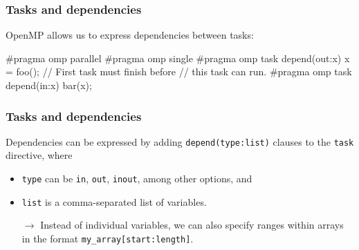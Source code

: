 \documentclass[12pt,t]{beamer}
\newcommand{\conclude}[1]{%
  \begin{itemize}
    \item[$\rightarrow$]#1
  \end{itemize}
}
\begin{document}
  \begin{frame}[fragile]
    \frametitle{Tasks and dependencies}

    OpenMP allows us to express dependencies between tasks:
    \begin{code}
#pragma omp parallel
{
  #pragma omp single
  {
    #pragma omp task depend(out:x)
    x = foo();
    // First task must finish before 
    // this task can run.
    #pragma omp task depend(in:x)
    bar(x);
  }
}
    \end{code}
  \end{frame}

  \begin{frame}[fragile]
    \frametitle{Tasks and dependencies}

    Dependencies can be expressed by adding \texttt{depend(type:list)} clauses to the \texttt{task} directive, where
    \begin{itemize}
      \item \texttt{type} can be \texttt{in}, \texttt{out}, \texttt{inout}, among other options, and
      \item \texttt{list} is a comma-separated list of variables.
    \end{itemize}
    \conclude{Instead of individual variables, we can also specify ranges within arrays in the format \texttt{my\_array[start:length]}.}
  \end{frame}
\end{document}
